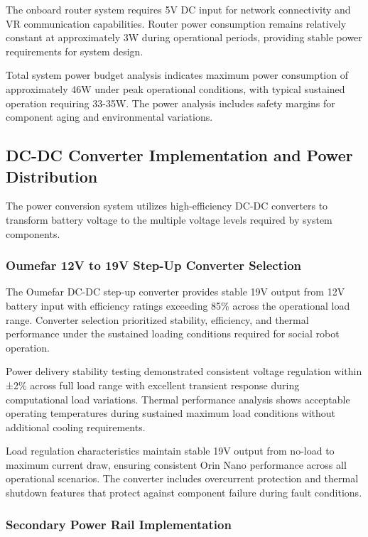 The onboard router system requires 5V DC input for network connectivity and VR communication capabilities. Router power consumption remains relatively constant at approximately 3W during operational periods, providing stable power requirements for system design.

Total system power budget analysis indicates maximum power consumption of approximately 46W under peak operational conditions, with typical sustained operation requiring 33-35W. The power analysis includes safety margins for component aging and environmental variations.

\subsection{DC-DC Converter Implementation and Power Distribution}

The power conversion system utilizes high-efficiency DC-DC converters to transform battery voltage to the multiple voltage levels required by system components.

\subsubsection{Oumefar 12V to 19V Step-Up Converter Selection}

The Oumefar DC-DC step-up converter provides stable 19V output from 12V battery input with efficiency ratings exceeding 85\% across the operational load range. Converter selection prioritized stability, efficiency, and thermal performance under the sustained loading conditions required for social robot operation.

Power delivery stability testing demonstrated consistent voltage regulation within ±2\% across full load range with excellent transient response during computational load variations. Thermal performance analysis shows acceptable operating temperatures during sustained maximum load conditions without additional cooling requirements.

Load regulation characteristics maintain stable 19V output from no-load to maximum current draw, ensuring consistent Orin Nano performance across all operational scenarios. The converter includes overcurrent protection and thermal shutdown features that protect against component failure during fault conditions.

\subsubsection{Secondary Power Rail Implementation}

